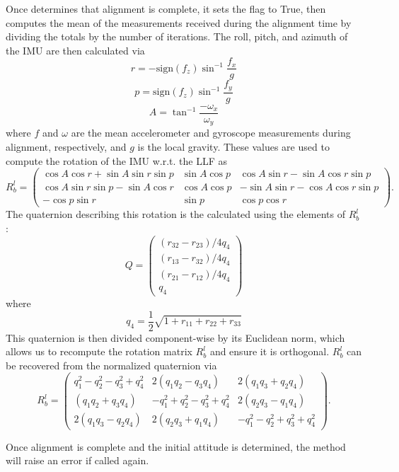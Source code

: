 \documentclass[11pt, oneside]{article}   	%
\begin{document}
Once  determines that alignment is complete, it sets the  flag to True, then computes the mean of the measurements received during the alignment time by dividing the totals by the number of iterations.  The roll, pitch, and azimuth of the IMU are then calculated via
$$r=-\textrm{sign}(f_z)\sin^{-1}\frac{f_x}{g}$$
$$p=\textrm{sign}(f_z)\sin^{-1}\frac{f_y}{g}$$
$$A=\tan^{-1}\frac{-\omega_x}{\omega_y}$$
where $f$ and $\omega$ are the mean accelerometer and gyroscope measurements during alignment, respectively, and $g$ is the local gravity.  These values are used to compute the rotation of the IMU w.r.t. the LLF as
$$ R_b^l=\begin{pmatrix}
\cos A \cos r + \sin A \sin r \sin p & \sin A \cos p & \cos A \sin r - \sin A \cos r \sin p \\
\cos A \sin r \sin p - \sin A \cos r & \cos A \cos p & -\sin A \sin r - \cos A \cos r \sin p \\
-\cos p \sin r & \sin p & \cos p \cos r
\end{pmatrix}.$$
The quaternion describing this rotation is the calculated using the elements of $R_b^l$:
$$Q=\begin{pmatrix}
(r_{32}-r_{23})/4q_4 \\
(r_{13}-r_{32})/4q_4 \\
(r_{21}-r_{12})/4q_4 \\
q_4
\end{pmatrix}$$
where
$$q_4=\frac12\sqrt{1+r_{11}+r_{22}+r_{33}}$$
This quaternion is then divided component-wise by its Euclidean norm, which allows us to recompute the rotation matrix $R_b^l$ and ensure it is orthogonal.  $R_b^l$ can be recovered from the normalized quaternion via
$$ R_b^l=\begin{pmatrix}
q_1^2-q_2^2-q_3^2+q_4^2 & 2(q_1q_2-q_3q_4) & 2(q_1q_3+q_2q_4) \\
(q_1q_2+q_3q_4) & -q_1^2+q_2^2-q_3^2+q_4^2 & 2(q_2q_3-q_1q_4) \\
2(q_1q_3-q_2q_4) &  2(q_2q_3+q_1q_4) & -q_1^2-q_2^2+q_3^2+q_4^2
\end{pmatrix}.$$

Once alignment is complete and the initial attitude is determined, the  method will raise an error if called again.
\end{document}
